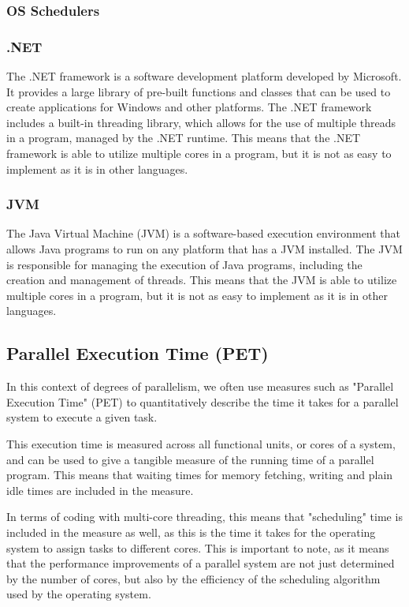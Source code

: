 \documentclass[12pt,a4paper]{article}
\begin{document}
\subsubsection{OS Schedulers}


\subsubsection{.NET}

The .NET framework is a software development platform developed by Microsoft. It provides a large library of pre-built functions and classes that can be used to create applications for Windows and other platforms. The .NET framework includes a built-in threading library, which allows for the use of multiple threads in a program, managed by the .NET runtime. This means that the .NET framework is able to utilize multiple cores in a program, but it is not as easy to implement as it is in other languages.

\subsubsection{JVM}

The Java Virtual Machine (JVM) is a software-based execution environment that allows Java programs to run on any platform that has a JVM installed. The JVM is responsible for managing the execution of Java programs, including the creation and management of threads. This means that the JVM is able to utilize multiple cores in a program, but it is not as easy to implement as it is in other languages.

\subsection{Parallel Execution Time (PET)}

In this context of degrees of parallelism, we often use measures such as "Parallel Execution Time" (PET) to quantitatively describe the time it takes for a parallel system to execute a given task. 

This execution time is measured across all functional units, or cores of a system, and can be used to give a tangible measure of the running time of a parallel program. This means that waiting times for memory fetching, writing and plain idle times are included in the measure.

In terms of coding with multi-core threading, this means that "scheduling" time is included in the measure as well, as this is the time it takes for the operating system to assign tasks to different cores. This is important to note, as it means that the performance improvements of a parallel system are not just determined by the number of cores, but also by the efficiency of the scheduling algorithm used by the operating system.
\end{document}
